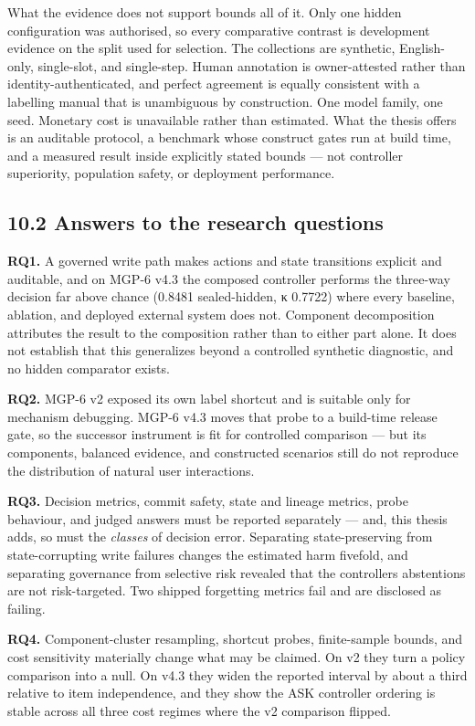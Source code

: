 What the evidence does not support bounds all of it. Only one hidden
configuration was authorised, so every comparative contrast is
development evidence on the split used for selection. The collections
are synthetic, English-only, single-slot, and single-step. Human
annotation is owner-attested rather than identity-authenticated, and
perfect agreement is equally consistent with a labelling manual that is
unambiguous by construction. One model family, one seed. Monetary cost
is unavailable rather than estimated. What the thesis offers is an
auditable protocol, a benchmark whose construct gates run at build time,
and a measured result inside explicitly stated bounds --- not controller
superiority, population safety, or deployment performance.

\subsection{10.2 Answers to the research
questions}\label{answers-to-the-research-questions}

\textbf{RQ1.} A governed write path makes actions and state transitions
explicit and auditable, and on MGP-6 v4.3 the composed controller
performs the three-way decision far above chance (0.8481 sealed-hidden,
κ 0.7722) where every baseline, ablation, and deployed external system
does not. Component decomposition attributes the result to the
composition rather than to either part alone. It does not establish that
this generalizes beyond a controlled synthetic diagnostic, and no hidden
comparator exists.

\textbf{RQ2.} MGP-6 v2 exposed its own label shortcut and is suitable
only for mechanism debugging. MGP-6 v4.3 moves that probe to a
build-time release gate, so the successor instrument is fit for
controlled comparison --- but its components, balanced evidence, and
constructed scenarios still do not reproduce the distribution of natural
user interactions.

\textbf{RQ3.} Decision metrics, commit safety, state and lineage
metrics, probe behaviour, and judged answers must be reported separately
--- and, this thesis adds, so must the \emph{classes} of decision error.
Separating state-preserving from state-corrupting write failures changes
the estimated harm fivefold, and separating governance from selective
risk revealed that the controller\textquotesingle s abstentions are not
risk-targeted. Two shipped forgetting metrics fail and are disclosed as
failing.

\textbf{RQ4.} Component-cluster resampling, shortcut probes,
finite-sample bounds, and cost sensitivity materially change what may be
claimed. On v2 they turn a policy comparison into a null. On v4.3 they
widen the reported interval by about a third relative to item
independence, and they show the ASK controller ordering is stable across
all three cost regimes where the v2 comparison flipped.

